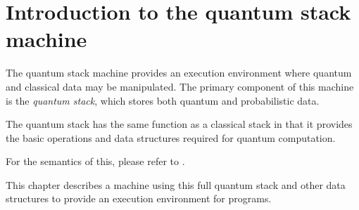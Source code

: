 \section{Introduction to the quantum stack machine}\label{sec:introStackMachine}
The quantum stack machine provides an execution environment where
 quantum and classical data may be manipulated. The primary component
of this machine is the \emph{quantum stack}, which stores both quantum and
probabilistic data.

The quantum stack  has the same function as a  classical stack 
in that it provides the basic
operations and data structures
 required for quantum computation. 

For the semantics of this, please refer to \cite{giles:msc2}.

This chapter  describes a machine using this full quantum stack and other
data structures to provide an execution environment for \lqpl{} programs.

